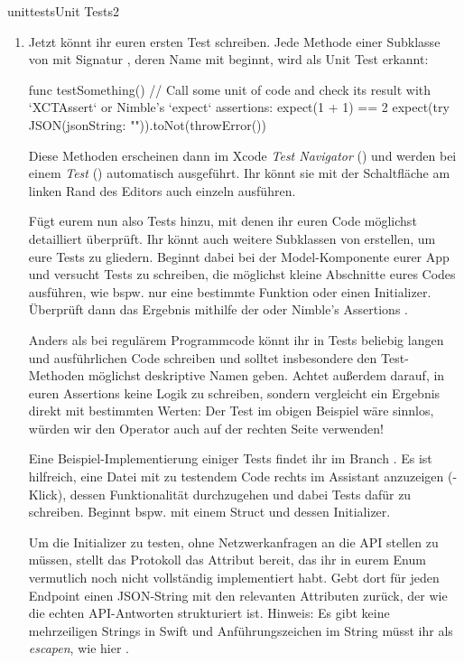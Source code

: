 \documentclass[parskip=half, final]{scrreprt}
\begin{document}
\begin{lecture}
\begin{exc}
\begin{excitem}{unittests}{Unit Tests}{2}
\begin{enumerate}[label=\arabic*.]
\item Jetzt könnt ihr euren ersten Test schreiben. Jede Methode einer Subklasse von  mit Signatur , deren Name mit  beginnt, wird als Unit Test erkannt: 
\begin{swiftcode}
    func testSomething() {
        // Call some unit of code and check its result with `XCTAssert` or Nimble's `expect` assertions:
        expect(1 + 1) == 2
        expect(try JSON(jsonString: "{}")).toNot(throwError())
    }
\end{swiftcode}
Diese Methoden erscheinen dann im Xcode \emph{Test Navigator} () und werden bei einem \emph{Test} () automatisch ausgeführt. Ihr könnt sie mit der Schaltfläche am linken Rand des Editors auch einzeln ausführen.

Fügt eurem  nun also Tests hinzu, mit denen ihr euren Code möglichst detailliert überprüft. Ihr könnt auch weitere Subklassen von  erstellen, um eure Tests zu gliedern. Beginnt dabei bei der Model-Komponente eurer App und versucht Tests zu schreiben, die möglichst kleine Abschnitte eures Codes ausführen, wie bspw. nur eine bestimmte Funktion oder einen Initializer. Überprüft dann das Ergebnis mithilfe der  oder Nimble's  Assertions .

Anders als bei regulärem Programmcode könnt ihr in Tests beliebig langen und ausführlichen Code schreiben und solltet insbesondere den Test-Methoden möglichst deskriptive Namen geben. Achtet außerdem darauf, in euren Assertions keine Logik zu schreiben, sondern vergleicht ein Ergebnis direkt mit bestimmten Werten: Der Test  im obigen Beispiel wäre sinnlos, würden wir den \swiftinline{+} Operator auch auf der rechten Seite verwenden!

Eine Beispiel-Implementierung einiger Tests findet ihr im  Branch . Es ist hilfreich, eine Datei mit zu testendem Code rechts im Assistant anzuzeigen (\keys{\Alt}-Klick), dessen Funktionalität durchzugehen und dabei Tests dafür zu schreiben. Beginnt bspw. mit einem  Struct und dessen Initializer.

Um die  Initializer zu testen, ohne Netzwerkanfragen an die API stellen zu müssen, stellt das  Protokoll das Attribut  bereit, das ihr in eurem Enum vermutlich noch nicht vollständig implementiert habt. Gebt dort für jeden Endpoint einen JSON-String mit den relevanten Attributen zurück, der wie die echten API-Antworten strukturiert ist. Hinweis: Es gibt keine mehrzeiligen Strings in Swift und Anführungszeichen im String müsst ihr als  \emph{escapen}, wie hier .


\end{enumerate}
\end{excitem}
\end{exc}
\end{lecture}
\end{document}
